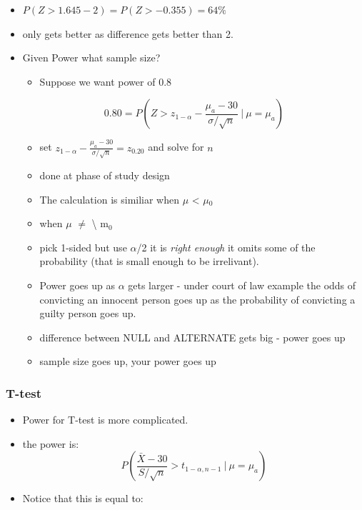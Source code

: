 \documentclass[11pt]{article}
\begin{document}
\begin{itemize}
\item $P(Z > 1.645 - 2) = P(Z > -0.355) = 64\%$
\item only gets better as difference gets better than 2.
\end{itemize}
\begin{itemize}

\item Given Power what sample size?
\label{sec-1-2-2-1}%
\begin{itemize}
\item Suppose we want power of 0.8
\end{itemize}
$$0.80 = P\left(Z > z_{1-\alpha} - \frac{\mu_a - 30}{\sigma /\sqrt{n}}
~|~ \mu = \mu_a \right)$$

\begin{itemize}
\item set $z_{1-\alpha} - \frac{\mu_a - 30}{\sigma /\sqrt{n}} = z_{0.20}$
  and solve for $n$
\item done at phase of study design
\item The calculation is similiar when $\mu$ < $\mu$$_0$
\item when $\mu$ $\ne$ \textbackslash{} m$_0$
\item pick 1-sided but use $\alpha$/2 it is \emph{right enough} it omits some of
  the probability (that is small enough to be irrelivant).
\item Power goes up as $\alpha$ gets larger - under court of law example
  the odds of convicting an innocent person goes up as the
  probability of convicting a guilty person goes up.
\item difference between NULL and ALTERNATE gets big - power goes up
\item sample size goes up, your power goes up
\end{itemize}

\end{itemize} %
\subsubsection{T-test}
\label{sec-1-2-3}

\begin{itemize}
\item Power for T-test is more complicated.
\item the power is:
    $$ P\left(\frac{\bar X - 30}{S /\sqrt{n}} > t_{1-\alpha, n-1} ~|~ \mu = \mu_a \right)   $$
\item Notice that this is equal to:
\end{itemize}
\end{document}
